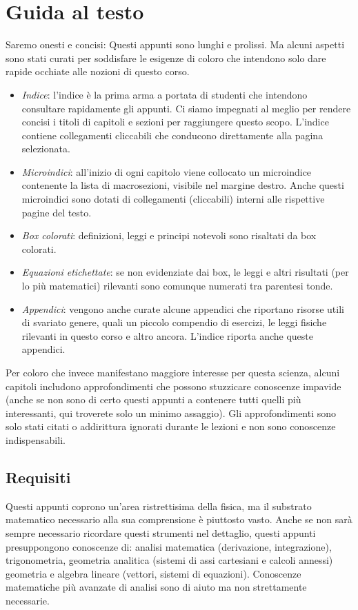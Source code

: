 \chapter*{Guida al testo}
Saremo onesti e concisi: Questi appunti sono lunghi e prolissi.
Ma alcuni aspetti sono
stati curati per soddisfare le esigenze di coloro che intendono solo dare rapide
occhiate alle nozioni di questo corso.

\begin{itemize}
    \item \textit{Indice}: l'indice è la prima arma a portata di studenti che intendono
    consultare rapidamente gli appunti. Ci siamo impegnati al meglio per rendere
    concisi i titoli di capitoli e sezioni per raggiungere questo scopo. L'indice
    contiene collegamenti cliccabili che conducono direttamente alla pagina selezionata.

    \item \textit{Microindici}: all'inizio di ogni capitolo viene collocato un microindice
    contenente la lista di macrosezioni, visibile nel margine destro. Anche questi microindici sono dotati di
    collegamenti (cliccabili) interni alle rispettive pagine del testo.

    \item \textit{Box colorati}: definizioni, leggi e principi notevoli sono risaltati
    da box colorati.
    
    \item \textit{Equazioni etichettate}: se non evidenziate dai box, le leggi e altri
    risultati (per lo più matematici) rilevanti sono comunque numerati tra
    parentesi tonde.

    \item \textit{Appendici}: vengono anche curate alcune appendici che riportano risorse
    utili di svariato genere, quali un piccolo compendio di esercizi, le leggi
    fisiche rilevanti in questo corso e altro ancora. L'indice riporta anche
    queste appendici.
\end{itemize}

Per coloro che invece manifestano maggiore interesse per questa scienza, alcuni
capitoli includono approfondimenti che possono stuzzicare conoscenze impavide (anche
se non sono di certo questi appunti a contenere tutti quelli più interessanti,
qui troverete solo un minimo assaggio).
Gli approfondimenti sono solo stati citati o addirittura ignorati durante
le lezioni e non sono conoscenze indispensabili.

\section*{Requisiti}
Questi appunti coprono un'area ristrettisima della fisica, ma il substrato
matematico necessario alla sua comprensione è piuttosto vasto. Anche
se non sarà sempre necessario ricordare questi strumenti nel dettaglio,
questi appunti presuppongono conoscenze di: analisi matematica (derivazione,
integrazione), trigonometria, geometria analitica (sistemi di assi
cartesiani e calcoli annessi) geometria e algebra lineare (vettori,
sistemi di equazioni). Conoscenze matematiche più avanzate di analisi
sono di aiuto ma non strettamente necessarie.

